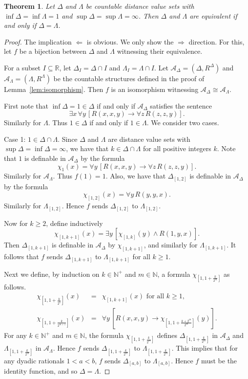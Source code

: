 \documentclass[10pt,a4paper]{amsart}
\newtheorem{theorem}{Theorem}
\begin{document}
\begin{theorem}\label{thm:CDVSinfty} Let $\Delta$ and $\Lambda$ be countable distance value sets with $\inf\Delta=\inf\Lambda=1$ and $\sup\Delta=\sup\Lambda=\infty$. Then $\Delta$ and $\Lambda$ are equivalent if and only if $\Delta=\Lambda$.
\end{theorem}

\begin{proof} The implication $\Leftarrow$ is obvious. We only show the $\Rightarrow$ direction. For this, let $f$ be a bijection between $\Delta$ and $\Lambda$ witnessing their equivalence. 

For a subset $I\subseteq \mathbb{R}$, let $\Delta_I=\Delta\cap I$ and $\Lambda_I=\Lambda\cap I$. Let $\mathcal{A}_\Delta=(\Delta, R^\Delta)$ and $\mathcal{A}_\Lambda=(\Lambda, R^\Lambda)$ be the countable structures defined in the proof of Lemma~\ref{lem:isomorphism}. Then $f$ is an isomorphism witnessing $\mathcal{A}_\Delta\cong \mathcal{A}_\Lambda$. 

First note that $\inf\Delta=1\in \Delta$ if and only if $\mathcal{A}_\Delta$ satisfies the sentence
$$ \exists x\, \forall y\, [ R(x, x, y)\rightarrow \forall z\, R(z, z, y)]. $$
Similarly for $\Lambda$. Thus $1\in \Delta$ if and only if $1\in \Lambda$. We consider two cases.

{\sc Case 1}: $1\in \Delta\cap \Lambda$. Since $\Delta$ and $\Lambda$ are distance value sets with $\sup\Delta=\inf\Delta=\infty$, we have that $k\in \Delta\cap \Lambda$ for all positive integers $k$. Note that $1$ is definable in $\mathcal{A}_\Delta$ by the formula
$$ \chi_1(x)=\forall y\, [ R(x, x, y)\rightarrow \forall z\, R(z, z, y)]. $$
Similarly for $\mathcal{A}_\Lambda$. Thus $f(1)=1$. Also, we have that $\Delta_{[1,2]}$ is definable in $\mathcal{A}_\Delta$ by the formula
$$ \chi_{[1,2]}(x)=\forall y\, R(y,y,x). $$
Similarly for $\Lambda_{[1,2]}$. Hence $f$ sends $\Delta_{[1,2]}$ to $\Lambda_{[1,2]}$. 

Now for $k\geq 2$, define inductively 
$$ \chi_{[1,k+1]}(x)=\exists y\, [\chi_{[1,k]}(y)\wedge R(1,y,x)]. $$
Then $\Delta_{[1,k+1]}$ is definable in $\mathcal{A}_\Delta$ by $\chi_{[1,k+1]}$, and similarly for $\Lambda_{[1,k+1]}$. It follows that $f$ sends $\Delta_{[1,k+1]}$ to $\Lambda_{[1,k+1]}$ for all $k\geq 1$.

Next we define, by induction on $k\in\mathbb{N}^+$ and $m\in\mathbb{N}$, a formula $\chi_{[1,1+\frac{k}{2^m}]}$ as follows.
$$\begin{array}{rcl} \chi_{[1, 1+\frac{k}{2^0}]}(x)&=&\chi_{[1, k+1]}(x) \mbox{ for all $k\geq 1$,} \\
\chi_{[1,1+\frac{k}{2^{m+1}}]}(x)&=& \forall y\, [R(x,x,y)\rightarrow \chi_{[1,1+\frac{k+2^m}{2^m}]}(y)].
\end{array}
$$
For any $k\in\mathbb{N}^+$ and $m\in\mathbb{N}$, the formula $\chi_{[1, 1+\frac{k}{2^m}]}$ defines $\Delta_{[1,1+\frac{k}{2^m}]}$ in $\mathcal{A}_\Delta$ and $\Lambda_{[1,1+\frac{k}{2^m}]}$ in $\mathcal{A}_\Lambda$. Hence $f$ sends $\Delta_{[1,1+\frac{k}{2^m}]}$ to $\Lambda_{[1,1+\frac{k}{2^m}]}$. This implies that for any dyadic rationals $1<a<b$, $f$ sends $\Delta_{[a,b]}$ to $\Lambda_{[a,b]}$. Hence $f$ must be the identity function, and so $\Delta=\Lambda$.


\end{proof}
\end{document}
